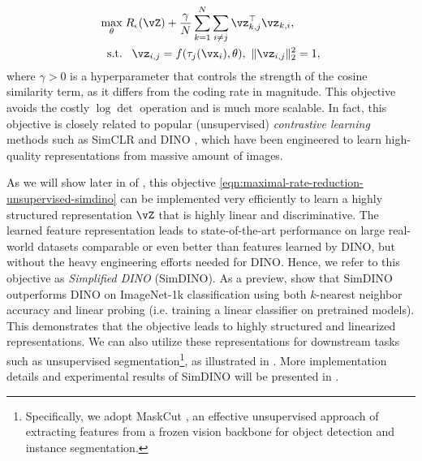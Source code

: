 \documentclass[../../book-main.tex]{subfiles}
\begin{document}
\begin{equation}
    \begin{aligned}
        \max_{\theta } & \;  R_{\epsilon}(\vZ) +
        \frac{\gamma}{N}\sum_{k=1}^N \sum_{i \neq j}
        \vz_{k,j}^\top \vz_{k,i}, \\
        \mbox{s.t.} &  \ \ \, \vz_{i,j} = f(\tau_j(\vx_i),\theta),\
        \|\vz_{i,j}\|_2^2                                          = 1,
    \end{aligned}
    \label{eqn:maximal-rate-reduction-unsupervised-simdino}
\end{equation}
where $\gamma > 0$ is a hyperparameter that controls the strength of
the cosine similarity term, as it differs from the coding rate in
magnitude. This objective avoids the costly $\log \det$ operation and
is much more scalable. In fact, this objective is closely related to
popular (unsupervised) {\em contrastive learning} methods such as
SimCLR \cite{chen2020simple} and DINO \cite{caron2021emerging}, which
have been engineered to learn high-quality representations from
massive amount of images.

As we will show later in
 of
, this objective
\eqref{eqn:maximal-rate-reduction-unsupervised-simdino} can be
implemented very efficiently to learn a highly structured
representation $\vZ$ that is highly linear and discriminative.
The learned feature representation leads to state-of-the-art
performance on large real-world datasets comparable or even better
than features learned by DINO, but without the heavy engineering
efforts needed for DINO. Hence, we refer to this objective as {\em
Simplified DINO} (SimDINO). As a preview,
 show that SimDINO
outperforms DINO on ImageNet-1k classification using both
\(k\)-nearest neighbor accuracy and linear probing (i.e. training a
linear classifier on pretrained models). This demonstrates that the
objective leads to highly structured and linearized representations.
We can also utilize these representations for downstream tasks such
as unsupervised segmentation\footnote{Specifically, we adopt MaskCut
    \cite{wang2023cut}, an effective unsupervised approach of extracting
    features from a frozen vision backbone for object detection and
instance segmentation.}, as illustrated in
. More implementation details and
experimental results of SimDINO will be presented in
.
\end{document}
